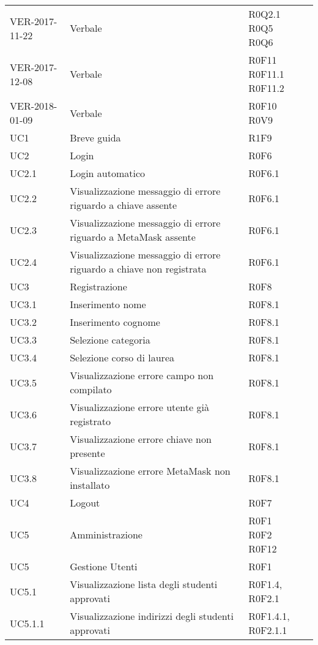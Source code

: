 \documentclass[AnalisiDeiRequisiti.tex]{subfiles}
\begin{document}
\begin{longtable}[H]{p{2cm}p{5cm}p{5cm}}
	VER-2017-11-22 & Verbale & \makecell[tl]{ R0Q2.1 \\
	 R0Q5 \\
	 R0Q6 } \\
	
	VER-2017-12-08 & Verbale & \makecell[tl]{ R0F11 \\
	 R0F11.1 \\
	 R0F11.2 } \\
	VER-2018-01-09 & Verbale & \makecell[tl]{ R0F10 \\
	R0V9 } \\ 
	
	UC1 & Breve guida & R1F9 \\
	UC2 & Login & R0F6 \\
	UC2.1 & Login automatico & R0F6.1 \\
	UC2.2 & Visualizzazione messaggio di errore riguardo a chiave assente & R0F6.1 \\
	UC2.3 & Visualizzazione messaggio di errore riguardo a MetaMask assente & R0F6.1 \\
	UC2.4 & Visualizzazione messaggio di errore riguardo a chiave non registrata & R0F6.1 \\
	UC3 & Registrazione & R0F8 \\
	UC3.1 & Inserimento nome & R0F8.1 \\
	UC3.2 & Inserimento cognome & R0F8.1 \\
	UC3.3 & Selezione categoria & R0F8.1 \\
	UC3.4 & Selezione corso di laurea & R0F8.1 \\
	UC3.5 & Visualizzazione errore campo non compilato & R0F8.1 \\
	UC3.6 & Visualizzazione errore utente già registrato & R0F8.1 \\
	UC3.7 & Visualizzazione errore chiave non presente & R0F8.1 \\
	UC3.8 & Visualizzazione errore MetaMask non installato & R0F8.1 \\
	UC4 & Logout & R0F7 \\
	UC5 & Amministrazione & \makecell[tl]{ R0F1 \\
		R0F2 \\
		R0F12 } \\
	UC5 & Gestione Utenti & R0F1 \\
	UC5.1 & Visualizzazione lista degli studenti approvati & R0F1.4, R0F2.1 \\
	UC5.1.1 & Visualizzazione indirizzi degli studenti approvati & R0F1.4.1, R0F2.1.1 \\

\end{longtable}
\end{document}
